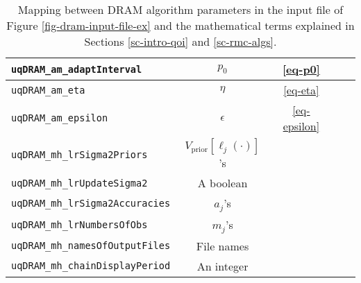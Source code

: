 \begin{sidewaystable}[h]
\begin{center}
\begin{tabular}{|l|c|c|c|c|}
\hline
\verb=uqDRAM_am_adaptInterval=           & $p_0$                               & \eqref{eq-p0}                                & \pageref{eq-p0}                                  &               \\
\hline
\verb=uqDRAM_am_eta=                     & $\eta$                              & \eqref{eq-eta}                               & \pageref{eq-eta}                                 &               \\
\hline
\verb=uqDRAM_am_epsilon=                 & $\epsilon$                          & \eqref{eq-epsilon}                           & \pageref{eq-epsilon}                             &               \\
\hline
\verb=uqDRAM_mh_lrSigma2Priors=          & $V_{\text{prior}}[\ell_j(\cdot)]$'s &                                              &                                                  &               \\
\hline
\verb=uqDRAM_mh_lrUpdateSigma2=          & A boolean                           &                                              &                                                  &               \\
\hline
\verb=uqDRAM_mh_lrSigma2Accuracies=      & $a_j$'s                             &                                              &                                                  &               \\
\hline
\verb=uqDRAM_mh_lrNumbersOfObs=          & $m_j$'s                             &                                              &                                                  &               \\
\hline
\verb=uqDRAM_mh_namesOfOutputFiles=      & File names                          &                                              &                                                  &               \\
\hline
\verb=uqDRAM_mh_chainDisplayPeriod=      & An integer                          &                                              &                                                  &               \\
\hline
\end{tabular}
\caption{Mapping between DRAM algorithm parameters in the input file of Figure \ref{fig-dram-input-file-ex} and the mathematical terms explained in Sections \ref{sc-intro-qoi} and \ref{sc-rmc-algs}.
}
\label{tab-dram-map}
\end{center}
\end{sidewaystable}


